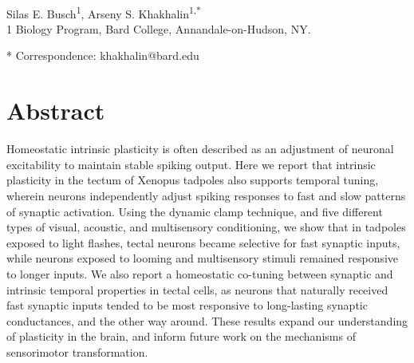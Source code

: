 \documentclass{article}
\begin{document}


\linenumbers %

\begin{flushleft}
{\Large
\textbf{}
}
\newline
\\
Silas E. Busch\textsuperscript{1},
Arseny S. Khakhalin\textsuperscript{1,*}
\\
\bigskip
{1} Biology Program, Bard College, Annandale-on-Hudson, NY. 

* Correspondence: khakhalin@bard.edu

\section*{Abstract}

Homeostatic intrinsic plasticity is often described as an adjustment of neuronal excitability to maintain stable spiking output. Here we report that intrinsic plasticity in the tectum of Xenopus tadpoles also supports temporal tuning, wherein neurons independently adjust spiking responses to fast and slow patterns of synaptic activation. Using the dynamic clamp technique, and five different types of visual, acoustic, and multisensory conditioning, we show that in tadpoles exposed to light flashes, tectal neurons became selective for fast synaptic inputs, while neurons exposed to looming and multisensory stimuli remained responsive to longer inputs. We also report a homeostatic co-tuning between synaptic and intrinsic temporal properties in tectal cells, as neurons that naturally received fast synaptic inputs tended to be most responsive to long-lasting synaptic conductances, and the other way around. These results expand our understanding of plasticity in the brain, and inform future work on the mechanisms of sensorimotor transformation.




\end{flushleft}
\end{document}
